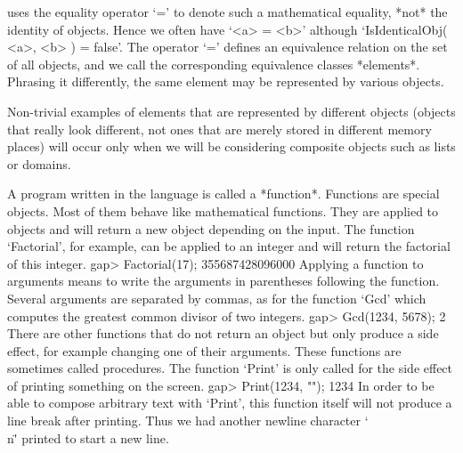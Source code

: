{\GAP}   uses  the equality operator  `='  to  denote such a mathematical
equality, *not* the identity of objects. Hence we often  have `<a> = <b>'
although `IsIdenticalObj( <a>, <b> ) =  false'.  The operator `=' defines
an equivalence relation on the set of all {\GAP} objects, and we call the
corresponding  equivalence classes *elements*.   Phrasing it differently,
the same element may be represented by various {\GAP} objects.

Non-trivial examples of   elements   that are represented by    different
objects (objects  that really  look different,  not ones  that are merely
stored in  different  memory places)  will  occur only   when  we will be
considering composite objects such as lists or domains.

%


A  program  written  in  the  {\GAP} language  is  called  a  *function*.
Functions  are   special  {\GAP}  objects.   Most  of  them  behave  like
mathematical functions.  They are applied to  objects and  will return  a
new  object  depending  on  the input.   The  function  `Factorial',  for
example,  can be applied to an  integer and will  return the factorial of
this integer.
\beginexample
gap> Factorial(17);
355687428096000
\endexample
Applying  a  function  to arguments  means  to  write  the  arguments  in
parentheses following the function.   Several arguments are  separated by
commas, as for the  function  `Gcd' which  computes  the greatest  common
divisor of two integers.
\beginexample
gap> Gcd(1234, 5678);
2
\endexample
There   are other functions that  do  not return   an  object but only
produce  a side effect, for  example changing one  of their arguments.
These functions are sometimes called procedures.  The function `Print'
is only called for the side effect of printing something on the screen.
\beginexample
gap> Print(1234, "\n");
1234
\endexample
In order to be able to compose arbitrary text with `Print', this function
itself will not produce a line break  after printing. Thus we had another
newline character `\"\\n\"' printed to start a new line.


